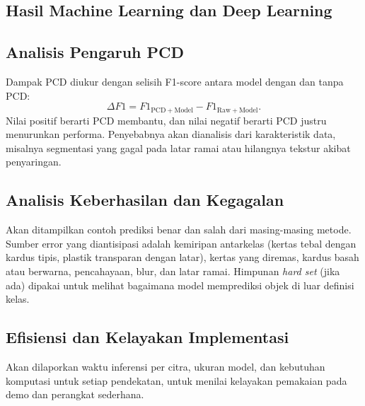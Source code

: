 \documentclass[10pt,twocolumn,a4paper]{article}
\begin{document}
\subsection{Hasil Machine Learning dan Deep Learning}
\begin{table}[H]
\centering
\caption{Perbandingan hasil eksperimen utama (diisi pada tahap berikutnya).}
\label{tab:result}
\end{table}

\subsection{Analisis Pengaruh PCD}
Dampak PCD diukur dengan selisih F1-score antara model dengan dan tanpa PCD:
\begin{equation}
\Delta F1 = F1_{\mathrm{PCD+Model}} - F1_{\mathrm{Raw+Model}}.
\end{equation}
Nilai positif berarti PCD membantu, dan nilai negatif berarti PCD justru menurunkan performa. Penyebabnya akan dianalisis dari karakteristik data, misalnya segmentasi yang gagal pada latar ramai atau hilangnya tekstur akibat penyaringan.

\subsection{Analisis Keberhasilan dan Kegagalan}
Akan ditampilkan contoh prediksi benar dan salah dari masing-masing metode. Sumber error yang diantisipasi adalah kemiripan antarkelas (kertas tebal dengan kardus tipis, plastik transparan dengan latar), kertas yang diremas, kardus basah atau berwarna, pencahayaan, blur, dan latar ramai. Himpunan \textit{hard set} (jika ada) dipakai untuk melihat bagaimana model memprediksi objek di luar definisi kelas.

\subsection{Efisiensi dan Kelayakan Implementasi}
Akan dilaporkan waktu inferensi per citra, ukuran model, dan kebutuhan komputasi untuk setiap pendekatan, untuk menilai kelayakan pemakaian pada demo dan perangkat sederhana.
\end{document}
